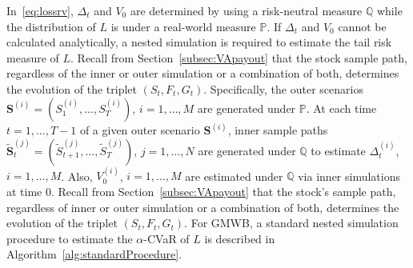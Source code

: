 \documentclass{article}
\newcommand{\bS}{\bm{S}}
\newcommand{\bStilde}{\widetilde{\bm{S}}}
\newcommand{\Stilde}{\widetilde{S}}
\newcommand{\Vhat}{\widehat{V}}
\newcommand{\Lhat}{\widehat{L}}
\newcommand{\Deltahat}{\widehat{\Delta}}
\begin{document}
In~\eqref{eq:lossrv}, $\Delta_t$ and $V_0$ are determined by using a risk-neutral measure $\mathbb{Q}$ while the distribution of $L$ is under a real-world measure $\mathbb{P}$.
If $\Delta_t$ and $V_0$ cannot be calculated analytically, a nested simulation is required to estimate the tail risk measure of $L$.
Recall from Section~\ref{subsec:VApayout} that the stock sample path, regardless of the inner or outer simulation or a combination of both, determines the evolution of the triplet $(S_t,F_t,G_t)$.
Specifically, the outer scenarios $\bS^{(i)} = (S_{1}^{(i)},\ldots,S_{T}^{(i)})$, $i=1,\ldots,M$ are generated under $\mathbb{P}$.
At each time~$t=1,\ldots,T-1$ of a given outer scenario $\bS^{(i)}$, inner sample paths $\bStilde_{t}^{(j)} = (\Stilde_{t+1}^{(j)},\ldots,\Stilde_{T}^{(j)})$, $j=1,\ldots,N$ are generated under $\mathbb{Q}$ to estimate $\Delta_t^{(i)}$, $i=1,\ldots,M$.
Also, $V_0^{(i)}$, $i=1,\ldots,M$ are estimated under $\mathbb{Q}$ via inner simulations at time $0$.
Recall from Section~\ref{subsec:VApayout} that the stock's sample path, regardless of inner or outer simulation or a combination of both, determines the evolution of the triplet $(S_t,F_t,G_t)$.
For GMWB, a standard nested simulation procedure to estimate the $\alpha$-CVaR of $L$ is described in Algorithm~\ref{alg:standardProcedure}.

    
    
\end{document}
